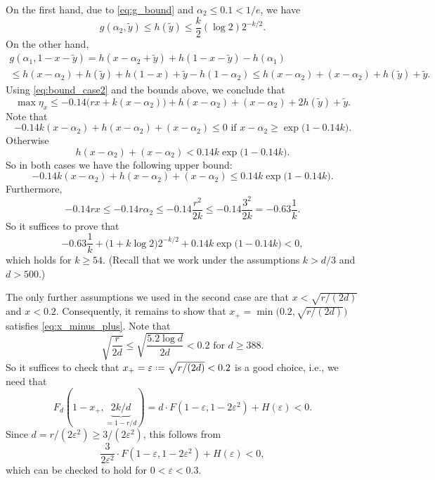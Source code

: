 \documentclass[12pt]{amsart}
\theoremstyle{definition}
\newcommand\yt{\widetilde{y}}
\newcommand\al{\alpha}
\newcommand\eps{\varepsilon}
\newcommand{\defeq}{\mathrel{\vcenter{\baselineskip0.5ex \lineskiplimit0pt
                     \hbox{\scriptsize.}\hbox{\scriptsize.}}}%
                     =}
\begin{document}
On the first hand, due to \eqref{eq:g_bound} and $\al_2 \leq 0.1 < 1/e$, we have
%
\[ g(\al_2,\yt) \leq h(\yt) 
\leq \frac{k}{2} (\log 2) 2^{-k/2}.\]
%
On the other hand, 
%
\begin{multline*}
g(\al_1,1-x-\yt) = h(x-\al_2+\yt) + h(1-x-\yt) - h(\al_1) \\
\leq h(x-\al_2)+h(\yt) + h(1-x) + \yt - h(1-\al_2)
\leq h(x-\al_2)+(x-\al_2)+h(\yt)+\yt .
\end{multline*} 
%
Using \eqref{eq:bound_case2} and the bounds above, we conclude that 
%
\[ \max \eta_x \leq - 0.14 \big( rx + k(x-\al_2) \big) 
+ h(x-\al_2)+(x-\al_2)+2h(\yt)+\yt .\]
%
Note that 
%
\[ - 0.14 k(x-\al_2) + h(x-\al_2)+(x-\al_2) \leq 0 
\text{ if } x-\al_2 \geq \exp\big( 1- 0.14 k \big) .\]
%
Otherwise 
%
%
\[ h(x-\al_2) + (x-\al_2) 
< 0.14 k \exp\big( 1- 0.14 k \big) .\]
%
So in both cases we have the following upper bound:
%
\[ - 0.14 k(x-\al_2) + h(x-\al_2)+(x-\al_2) 
\leq 0.14 k \exp\big( 1- 0.14 k \big) .\]
%
Furthermore, 
%
\[ - 0.14 rx 
\leq - 0.14 r \al_2 
\leq -0.14 \frac{r^2}{2k} 
\leq -0.14 \frac{3^2}{2k} 
= - 0.63 \frac{1}{k} .\]
%
So it suffices to prove that 
%
\[ -0.63 \frac{1}{k} + \big(1+ k \log 2 \big) 2^{-k/2} + 0.14 k \exp\big( 1- 0.14 k \big) < 0 ,\]
%
which holds for $k \geq 54$. (Recall that we work under the assumptions $k>d/3$ and $d>500$.)

The only further assumptions we used in the second case are that $x < \sqrt{r/(2d)}$ and $x<0.2$. Consequently, it remains to show that $x_+=\min\big(0.2, \sqrt{r/(2d)}\big)$ satisfies \eqref{eq:x_minus_plus}. Note that  
%
\[ \sqrt{\frac{r}{2d}} \leq \sqrt{\frac{5.2 \log d}{2d}} 
< 0.2 \text{ for } d \geq 388 .\]
%
So it suffices to check that $x_+= \eps \defeq \sqrt{r/(2d)}<0.2$ is a good choice, i.e., we need that 
%
\[ F_d(1-x_+,\underbrace{2k/d}_{=1-r/d}) 
= d \cdot F(1-\eps,1-2\eps^2) + H(\eps) < 0 .\]
%
Since $d = r/(2 \eps^2) \geq 3/(2 \eps^2)$, this follows from 
%
\[ \frac{3}{2 \eps^2} \cdot F(1-\eps,1-2\eps^2) + H(\eps) < 0 ,\]
%
which can be checked to hold for $0<\eps<0.3$.




\end{document}
